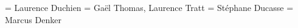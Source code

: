 \documentclass[a4paper,12pt,twoside]{../includes/ThesisStyle}
\begin{document}
\fi

\ThesisDate{}
\ThesisLilleI
\President = {
Laurence Duchien
} 
\Rapporteurs = {
Ga\"el Thomas,
Laurence Tratt 
} 
\Directeur = {
St\'ephane Ducasse
}
\Coencadreur = {
Marcus Denker}

\MakeThesisTitlePage 

\ifx\wholebook\relax\else
    
\end{document}
